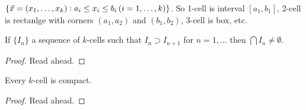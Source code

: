 \documentclass[]{article}
\begin{document}
\begin{definition}
	[$k$-cell] $\{\vec{x} = (x_1,\dots,x_k) : a_i\leq x_i\leq b_i\, (i = 1,\dots,k)\}$. So 1-cell is interval $[a_1,b_1]$, 2-cell is rectanlge with corners $(a_1,a_2)$ and $(b_1,b_2)$, 3-cell is box, etc.
\end{definition}
\begin{theorem}
	If $\{I_n\}$ a sequence of $k$-cells such that $I_n\supset I_{n+1}$ for $n=1,\dots$ then $\bigcap I_n\neq\emptyset$.
\end{theorem}
\begin{proof}
	Read ahead.
\end{proof}

\begin{theorem}
	Every $k$-cell is compact.
\end{theorem}
\begin{proof}
	Read ahead.
\end{proof}
\end{document}
